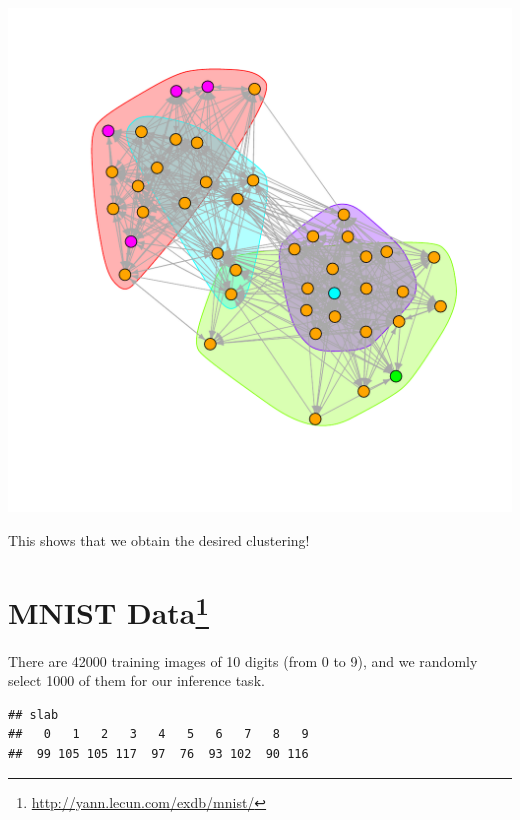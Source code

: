\documentclass[]{article}
\newenvironment{Shaded}{\begin{snugshade}}{\end{snugshade}}
\newcommand{\KeywordTok}[1]{\textcolor[rgb]{0.13,0.29,0.53}{\textbf{#1}}}
\newcommand{\StringTok}[1]{\textcolor[rgb]{0.31,0.60,0.02}{#1}}
\newcommand{\OperatorTok}[1]{\textcolor[rgb]{0.81,0.36,0.00}{\textbf{#1}}}
\newcommand{\NormalTok}[1]{#1}
\let\rmarkdownfootnote\footnote%
\def\footnote{\protect\rmarkdownfootnote}
\begin{document}
\includegraphics{gmmase_files/figure-latex/plotg-1.pdf}

This shows that we obtain the desired clustering!

\section[MNIST Data]{\texorpdfstring{MNIST Data\footnote{\url{http://yann.lecun.com/exdb/mnist/}}}{MNIST Data}}\label{mnist-data}

There are 42000 training images of 10 digits (from 0 to 9), and we
randomly select 1000 of them for our inference task.

\begin{Shaded}
\end{Shaded}

\begin{verbatim}
## slab
##   0   1   2   3   4   5   6   7   8   9 
##  99 105 105 117  97  76  93 102  90 116
\end{verbatim}
\end{document}
